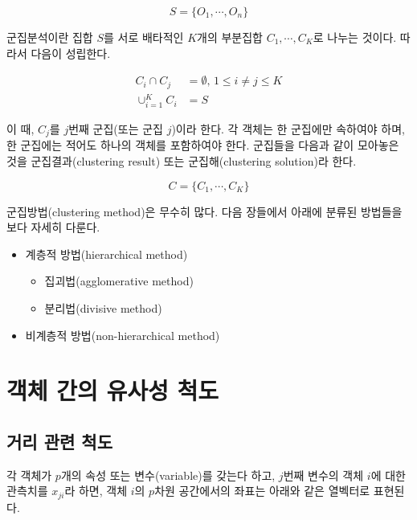 \documentclass[
]{book}
\providecommand{\tightlist}{%
  \setlength{\itemsep}{0pt}\setlength{\parskip}{0pt}}
\begin{document}
\begin{equation*}
S = \{O_1, \cdots, O_n\}
\end{equation*}

군집분석이란 집합 \(S\)를 서로 배타적인 \(K\)개의 부분집합 \(C_1, \cdots, C_K\)로 나누는 것이다. 따라서 다음이 성립한다.

\begin{equation*}
\begin{split}
C_i \cap C_j &= \emptyset, \, 1 \leq i \neq j \leq K\\
\cup_{i = 1}^{K} C_i &= S
\end{split}
\end{equation*}

이 때, \(C_j\)를 \(j\)번째 군집(또는 군집 \(j\))이라 한다. 각 객체는 한 군집에만 속하여야 하며, 한 군집에는 적어도 하나의 객체를 포함하여야 한다. 군집들을 다음과 같이 모아놓은 것을 군집결과(clustering result) 또는 군집해(clustering solution)라 한다.

\begin{equation*}
C = \{C_1, \cdots, C_K\}
\end{equation*}

군집방법(clustering method)은 무수히 많다. 다음 장들에서 아래에 분류된 방법들을 보다 자세히 다룬다.

\begin{itemize}
\tightlist
\item
  계층적 방법(hierarchical method)

  \begin{itemize}
  \tightlist
  \item
    집괴법(agglomerative method)
  \item
    분리법(divisive method)
  \end{itemize}
\item
  비계층적 방법(non-hierarchical method)
\end{itemize}

\hypertarget{object-similarity-metric}{%
\section{객체 간의 유사성 척도}\label{object-similarity-metric}}

\hypertarget{object-distance-metric}{%
\subsection{거리 관련 척도}\label{object-distance-metric}}

각 객체가 \(p\)개의 속성 또는 변수(variable)를 갖는다 하고, \(j\)번째 변수의 객체 \(i\)에 대한 관측치를 \(x_{ji}\)라 하면, 객체 \(i\)의 \(p\)차원 공간에서의 좌표는 아래와 같은 열벡터로 표현된다.
\end{document}
